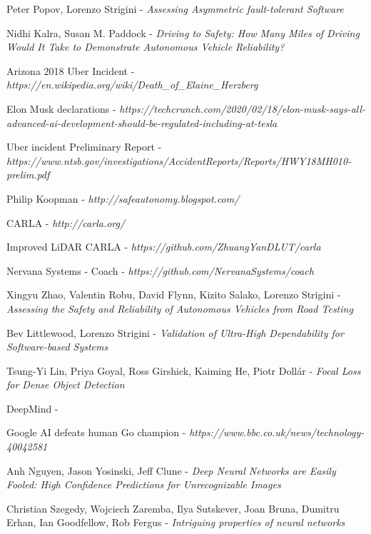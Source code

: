 \begin{thebibliography}{9}

Peter Popov, Lorenzo Strigini - \textit{Assessing Asymmetric fault-tolerant Software}

Nidhi Kalra, Susan M. Paddock - \textit{Driving to Safety: How Many Miles of Driving Would It Take to Demonstrate Autonomous Vehicle Reliability?}

Arizona 2018 Uber Incident - \textit{https://en.wikipedia.org/wiki/Death\_of\_Elaine\_Herzberg}

Elon Musk declarations - \textit{https://techcrunch.com/2020/02/18/elon-musk-says-all-advanced-ai-development-should-be-regulated-including-at-tesla}

Uber incident Preliminary Report - \textit{https://www.ntsb.gov/investigations/AccidentReports/Reports/HWY18MH010-prelim.pdf}

Philip Koopman - \textit{http://safeautonomy.blogspot.com/}

CARLA - \textit{http://carla.org/}

Improved LiDAR CARLA - \textsl{https://github.com/ZhuangYanDLUT/carla}

Nervana Systems - Coach - \textit{https://github.com/NervanaSystems/coach}

Xingyu Zhao, Valentin Robu, David Flynn, Kizito Salako, Lorenzo Strigini - \textit{Assessing the Safety and Reliability of Autonomous Vehicles from Road Testing}

Bev Littlewood, Lorenzo Strigini - \textit{Validation of Ultra-High Dependability for Software-based Systems}

Tsung-Yi Lin, Priya Goyal, Ross Girshick, Kaiming He, Piotr Dollár - \textit{Focal Loss for Dense Object Detection}

DeepMind - 

Google AI defeats human Go champion - \textit{https://www.bbc.co.uk/news/technology-40042581}

Anh Nguyen, Jason Yosinski, Jeff Clune - \textit{Deep Neural Networks are Easily Fooled: High Confidence Predictions for Unrecognizable Images}

Christian Szegedy, Wojciech Zaremba, Ilya Sutskever, Joan Bruna, Dumitru Erhan, Ian Goodfellow, Rob Fergus - \textit{Intriguing properties of neural networks}


\end{thebibliography}
